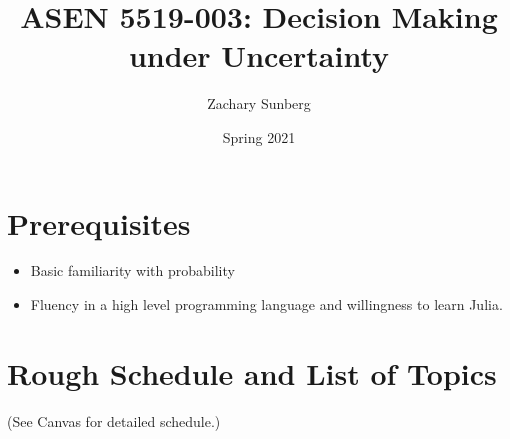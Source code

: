 \documentclass[9pt]{article}
\title{ASEN 5519-003: Decision Making under Uncertainty}
\author{Zachary Sunberg}
\date{Spring 2021}
\begin{document}
\maketitle

\section*{Prerequisites}

\begin{itemize}
    \item Basic familiarity with probability
    \item Fluency in a high level programming language and willingness to learn Julia.
\end{itemize}

\section*{Rough Schedule and List of Topics}

(See Canvas for detailed schedule.)
\end{document}
